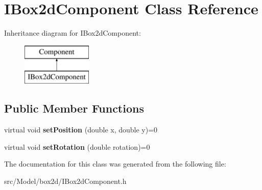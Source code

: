 \hypertarget{classIBox2dComponent}{}\section{I\+Box2d\+Component Class Reference}
\label{classIBox2dComponent}
Inheritance diagram for I\+Box2d\+Component\+:\begin{figure}[H]
\begin{center}
\leavevmode
\includegraphics[height=2.000000cm]{classIBox2dComponent}
\end{center}
\end{figure}
\subsection*{Public Member Functions}
\begin{DoxyCompactItemize}
\item 
virtual void {\bfseries set\+Position} (double x, double y)=0\hypertarget{classIBox2dComponent_a2a65930e3f85605da4cbc31106b42f2c}{}\label{classIBox2dComponent_a2a65930e3f85605da4cbc31106b42f2c}

\item 
virtual void {\bfseries set\+Rotation} (double rotation)=0\hypertarget{classIBox2dComponent_a0b5f76bd2ba3314ff28ddd0c687c8263}{}\label{classIBox2dComponent_a0b5f76bd2ba3314ff28ddd0c687c8263}

\end{DoxyCompactItemize}


The documentation for this class was generated from the following file\+:\begin{DoxyCompactItemize}
\item 
src/\+Model/box2d/I\+Box2d\+Component.\+h\end{DoxyCompactItemize}
